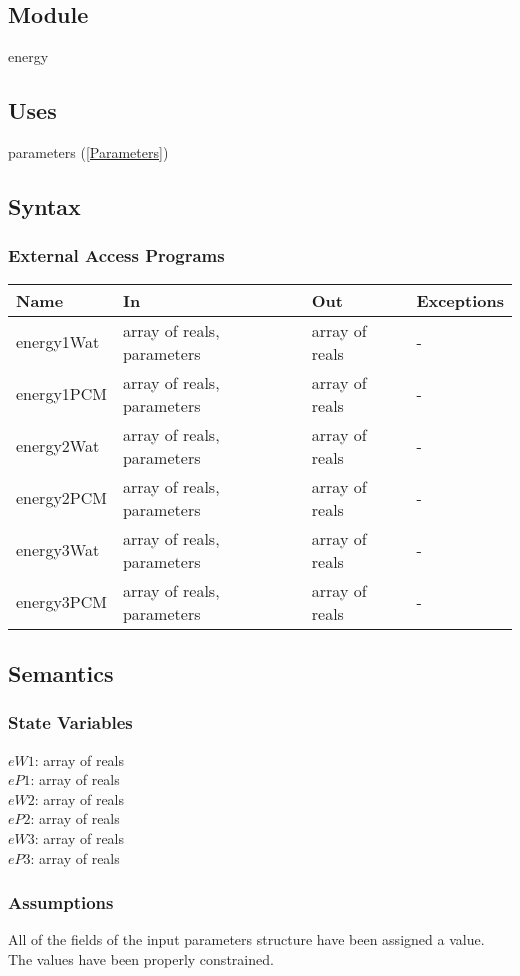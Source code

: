 \documentclass[12pt]{article}
\begin{document}
\subsection{Module}
energy
\subsection{Uses}
parameters (\ref{Parameters})
\subsection{Syntax}
\subsubsection{External Access Programs}
\begin{center}
\begin{tabular}{p{3cm} p{6cm} p{3cm} p{2cm}}
\hline
\textbf{Name} & \textbf{In} & \textbf{Out} & \textbf{Exceptions} \\
\hline
energy1Wat & array of reals, parameters & array of reals & - \\
\hline
energy1PCM & array of reals, parameters & array of reals & - \\
\hline
energy2Wat & array of reals, parameters & array of reals & - \\
\hline
energy2PCM & array of reals, parameters & array of reals & - \\
\hline
energy3Wat & array of reals, parameters & array of reals & - \\
\hline
energy3PCM & array of reals, parameters & array of reals & - \\
\hline
\end{tabular}
\end{center}
\subsection{Semantics}
\subsubsection{State Variables}
$eW1$: array of reals \\
$eP1$: array of reals \\
$eW2$: array of reals \\
$eP2$: array of reals \\
$eW3$: array of reals \\
$eP3$: array of reals 
\subsubsection{Assumptions}
All of the fields of the input parameters structure have been assigned a value. The values have been properly constrained.
\end{document}
